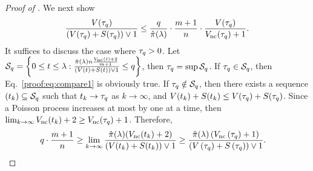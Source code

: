 \begin{proof}[Proof of ]
We next show
\begin{align}\label{proof:eq:compare1}
    \frac{{V}({\tau_q})}{({V}({\tau_q}) + {S}({\tau_q})) \vee 1}
    \le \frac{q}{\hat{\pi}(\lambda)} \cdot \frac{m+1}{{n}} \cdot \frac{{V}({\tau_q})}{{V_{\text{nc}}}({\tau_q}) + 1}.
\end{align}
It suffices to discuss the case where ${\tau_q} > 0$.
Let $\mathcal{S}_q = \left\{0 \le t \le \lambda: \frac{\hat{\pi}(\lambda){n}\frac{V_{\text{nc}}(t) + 2}{m+1}}{(V(t) + S(t)) \vee 1} \le q \right\}$, then ${\tau_q} = \sup \mathcal{S}_q$.
If ${\tau_q} \in \mathcal{S}_q$, then Eq.~\eqref{proof:eq:compare1} is obviously true.
If ${\tau_q} \notin \mathcal{S}_q$, then there exists a sequence $(t_k) \subseteq \mathcal{S}_q$ such that $t_k \to {\tau_q}$ as $k \to \infty$, and ${V}(t_k) + {S}(t_k) \le {V}({\tau_q}) + {S}({\tau_q})$.
Since a Poisson process increases at most by one at a time, then $\lim_{k\to \infty}{V_{\text{nc}}}(t_k) + 2 \ge {V_{\text{nc}}}({\tau_q}) + 1$. Therefore,
\begin{align*}
 q \cdot \frac{m+1}{{n}} &\ge \lim_{k \to \infty}\frac{\hat{\pi}(\lambda)({V_{\text{nc}}}(t_k) + 2)}{({V}(t_k) + {S}(t_k)) \vee 1}
 \ge \frac{\hat{\pi}(\lambda)
 \left({V_{\text{nc}}}\left({\tau_q}\right) + 1\right)}{\left({V}\left({\tau_q}\right) + {S}\left({\tau_q}\right)\right) \vee 1}.
\end{align*}



\end{proof}
